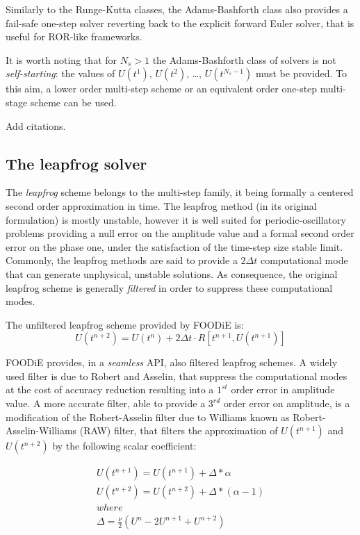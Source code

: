 \documentclass[pdftex,preprint,3p,times,numbers]{elsarticle}
\begin{document}
Similarly to the Runge-Kutta classes, the Adams-Bashforth class also provides a fail-safe one-step solver reverting back to the explicit forward Euler solver, that is useful for ROR-like frameworks.

It is worth noting that for $N_s>1$ the Adams-Bashforth class of solvers is not \emph{self-starting}: the values of $U\left(t^{1}\right)$, $U\left(t^{2}\right)$, \dots, $U\left(t^{N_s-1}\right)$ must be provided. To this aim, a lower order multi-step scheme or an equivalent order one-step multi-stage scheme can be used.

{\color{red} Add citations.}

\subsection{The leapfrog solver}

The \emph{leapfrog} scheme belongs to the multi-step family, it being formally a centered second order approximation in time. The leapfrog method (in its original formulation) is mostly unstable, however it is well suited for periodic-oscillatory problems providing a null error on the amplitude value and a formal second order error on the phase one, under the satisfaction of the time-step size stable limit. Commonly, the leapfrog methods are said to provide a $2 \Delta t$ computational mode that can generate unphysical, unstable solutions. As consequence, the original leapfrog scheme is generally \emph{filtered} in order to suppress these computational modes.

The unfiltered leapfrog scheme provided by FOODiE is:
\begin{equation}
  U\left(t^{n+2}\right) = U\left(t^{n}\right) + 2\Delta t \cdot R\left[t^{n+1}, U\left(t^{n+1}\right)\right]
\label{eq:leapfrog}
\end{equation}

FOODiE provides, in a \emph{seamless} API, also filtered leapfrog schemes. A widely used filter is due to Robert and Asselin, that suppress the computational modes at the cost of accuracy reduction resulting into a $1^{st}$ order error in amplitude value. A more accurate filter, able to provide a $3^{rd}$ order error on amplitude, is a modification of the Robert-Asselin filter due to Williams known as Robert-Asselin-Williams (RAW) filter, that filters the approximation of $U\left(t^{n+1}\right)$ and $U\left(t^{n+2}\right)$ by the following scalar coefficient:

\begin{equation}
  \begin{matrix}
    U\left(t^{n+1}\right) = U\left(t^{n+1}\right) + \Delta * \alpha     \\
    U\left(t^{n+2}\right) = U\left(t^{n+2}\right) + \Delta * (\alpha-1) \\
    where \\
    \Delta = \frac{\nu}{2}(U^{n} - 2 U^{n+1} + U^{n+2})
  \end{matrix}
\label{eq:leapfrog-RAW}
\end{equation}
\end{document}
